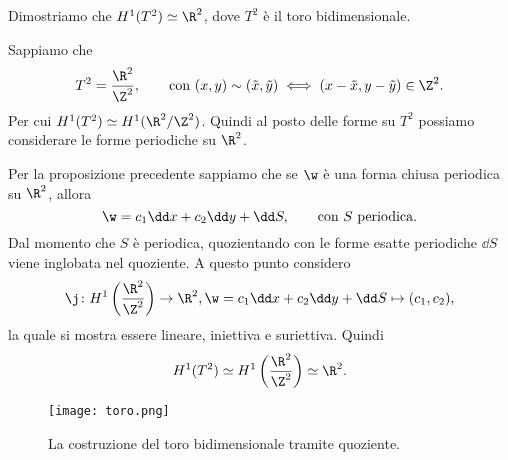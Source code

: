 \begin{ese}
	Dimostriamo che \(H^1(T^2) \simeq \R^2\), dove \(T^2\) è il toro bidimensionale.

	Sappiamo che
	\[
		T^2 = \frac{\R^2}{\Z^2}, \qquad\text{con }(x,y) \sim (\tilde{x},\tilde{y}) \iff (x-\tilde{x},y-\tilde{y}) \in \Z^2.
	\]
	Per cui \(H^1(T^2) \simeq H^1(\R^2/\Z^2)\).
	Quindi al posto delle forme su \(T^2\) possiamo considerare le forme periodiche su \(\R^2\).

	Per la proposizione precedente sappiamo che se \(\w\) è una forma chiusa periodica su \(\R^2\), allora
	\[
		\w = c_1 \dd x + c_2 \dd y + \dd S, \qquad\text{con \(S\) periodica}.
	\]
	Dal momento che \(S\) è periodica, quozientando con le forme esatte periodiche \(\dd S\) viene inglobata nel quoziente.
	A questo punto considero
	\[
		\j\colon H^1 \left(\frac{\R^2}{\Z^2}\right) \to \R^2, \w=c_1\dd x+ c_2 \dd y + \dd S \mapsto (c_1,c_2),
	\]
	la quale si mostra essere lineare, iniettiva e suriettiva.
	Quindi
	\[
		H^1(T^2) \simeq H^1 \left(\frac{\R^2}{\Z^2}\right) \simeq \R^2.
	\]
\end{ese}

\begin{figure}[tp]
	\begin{centering}
		\texttt{[image: toro.png]}
		\caption{La costruzione del toro bidimensionale tramite quoziente.}
		\label{fig:toro}
	\end{centering}
\end{figure}